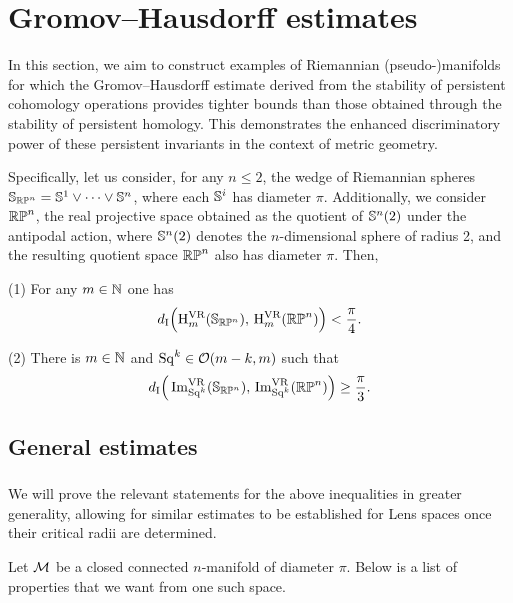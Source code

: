 
\section{Gromov--Hausdorff estimates}\label{s:gh_estimates}

In this section, we aim to construct examples of Riemannian (pseudo-)manifolds for which the Gromov--Hausdorff estimate derived from the stability of persistent cohomology operations provides tighter bounds than those obtained through the stability of persistent homology.
This demonstrates the enhanced discriminatory power of these persistent invariants in the context of metric geometry.

Specifically, let us consider, for any \(n \leq 2\), the wedge of Riemannian spheres \(\mathbb{S}_{\mathbb{RP}^n} = \mathbb{S}^1 \vee \dots \vee \mathbb{S}^n\), where each \(\mathbb{S}^i\) has diameter \(\pi\).
Additionally, we consider \(\mathbb{RP}^n\), the real projective space obtained as the quotient of \(\mathbb{S}^n(2)\) under the antipodal action, where \(\mathbb{S}^n(2)\) denotes the \(n\)-dimensional sphere of radius 2, and the resulting quotient space \(\mathbb{RP}^n\) also has diameter \(\pi\).
Then,

\medskip (1) For any \(m \in \mathbb{N}\) one has
\[
d_{\mathrm{I}}\Big(\mathrm{H}^{\mathrm{VR}}_m(\mathbb{S}_{\mathbb{RP}^n}),\, \mathrm{H}^{\mathrm{VR}}_m(\mathbb{RP}^n)\Big) < \frac{\pi}{4}.
\]

(2) There is \(m \in \mathbb{N}\) and \(\mathrm{Sq}^k \in \mathcal{O}(m-k, m)\) such that
\[
d_{\mathrm{I}}\Big(\operatorname{Im}_{\mathrm{Sq}^k}^{\mathrm{VR}}(\mathbb{S}_{\mathbb{RP}^n}),\, \operatorname{Im}_{\mathrm{Sq}^k}^{\mathrm{VR}}(\mathbb{RP}^n)\Big) \geq \frac{\pi}{3}.
\]

\subsection{General estimates}\label{ss:genberal_distance_comparison}

\subsubsection{}

We will prove the relevant statements for the above inequalities in greater generality, allowing for similar estimates to be established for Lens spaces once their critical radii are determined.

Let $\mathcal{M}$ be a closed connected \(n\)-manifold of diameter $\pi$.
Below is a list of properties that we want from one such space.


